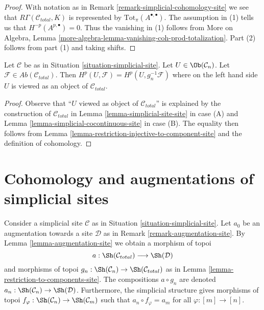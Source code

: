 \begin{proof}
With notation as in Remark \ref{remark-simplicial-cohomology-site}
we see that $R\Gamma(\mathcal{C}_{total}, K)$ is
represented by $\text{Tot}_\pi(A^{\bullet, \bullet})$.
The assumption in (1) tells us that $H^{-p}(A^{p, \bullet}) = 0$.
Thus the vanishing in (1) follows from
More on Algebra, Lemma \ref{more-algebra-lemma-vanishing-coh-prod-totalization}.
Part (2) follows from part (1) and taking shifts.
\end{proof}

\begin{lemma}
\label{lemma-sanity-check}
Let $\mathcal{C}$ be as in Situation \ref{situation-simplicial-site}.
Let $U \in \Ob(\mathcal{C}_n)$. Let
$\mathcal{F} \in \textit{Ab}(\mathcal{C}_{total})$.
Then $H^p(U, \mathcal{F}) = H^p(U, g_n^{-1}\mathcal{F})$
where on the left hand side $U$ is viewed as an object of $\mathcal{C}_{total}$.
\end{lemma}

\begin{proof}
Observe that ``$U$ viewed as object of $\mathcal{C}_{total}$''
is explained by the construction of $\mathcal{C}_{total}$ in
Lemma \ref{lemma-simplicial-site-site} in case (A) and
Lemma \ref{lemma-simplicial-cocontinuous-site} in case (B).
The equality then follows from
Lemma \ref{lemma-restriction-injective-to-component-site}
and the definition of cohomology.
\end{proof}






\section{Cohomology and augmentations of simplicial sites}
\label{section-cohomology-augmentation-simplicial-sites}

\noindent
Consider a simplicial site $\mathcal{C}$ as in
Situation \ref{situation-simplicial-site}.
Let $a_0$ be an augmentation towards a site $\mathcal{D}$ as in
Remark \ref{remark-augmentation-site}.
By Lemma \ref{lemma-augmentation-site} we obtain a morphism of topoi
$$
a : \Sh(\mathcal{C}_{total}) \longrightarrow \Sh(\mathcal{D})
$$
and morphisms of topoi
$g_n : \Sh(\mathcal{C}_n) \to \Sh(\mathcal{C}_{total})$
as in Lemma \ref{lemma-restriction-to-components-site}.
The compositions $a \circ g_n$ are denoted
$a_n : \Sh(\mathcal{C}_n) \to \Sh(\mathcal{D})$.
Furthermore, the simplicial structure gives
morphisms of topoi
$f_\varphi : \Sh(\mathcal{C}_n) \to \Sh(\mathcal{C}_m)$
such that $a_n \circ f_\varphi = a_m$ for all $\varphi : [m] \to [n]$.

